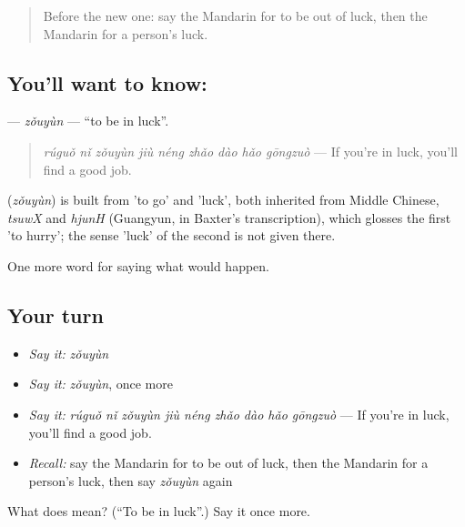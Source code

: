 \label{lesson:ZH-C529-zouyun}



\begin{quote}
Before the new one: say the Mandarin for to be out of luck, then the Mandarin for a person's luck.
\end{quote}

\subsection*{You'll want to know: }
\textbf{} — \emph{zǒuyùn} — \textquotedblleft{}to be in luck\textquotedblright{}.

\begin{quote}
\textbf{} \emph{rúguǒ nǐ zǒuyùn jiù néng zhǎo dào hǎo gōngzuò} — If you're in luck, you'll find a good job.
\end{quote}

\begin{cousinweb}
\textbf{} (\emph{zǒuyùn}) is built from  'to go' and  'luck', both inherited from Middle Chinese, \emph{tsuwX} and \emph{hjunH} (Guangyun, in Baxter's transcription), which glosses the first 'to hurry'; the sense 'luck' of the second is not given there.
\end{cousinweb}

\begin{grammarlens}[title={What you've built}]
One more word for saying what would happen.
\end{grammarlens}

\subsection*{Your turn}
\begin{itemize}
\raggedright
  \item \emph{Say it:} \emph{zǒuyùn}
  \item \emph{Say it:} \emph{zǒuyùn}, once more
  \item \emph{Say it:} \emph{rúguǒ nǐ zǒuyùn jiù néng zhǎo dào hǎo gōngzuò} — If you're in luck, you'll find a good job.
  \item \emph{Recall:} say the Mandarin for to be out of luck, then the Mandarin for a person's luck, then say \emph{zǒuyùn} again
\end{itemize}

\begin{tcolorbox}[breakable,colback=teal!4,colframe=teal!35!black,title={Before you move on}]
What does  mean? (\textquotedblleft{}To be in luck\textquotedblright{}.) Say it once more.
\end{tcolorbox}
